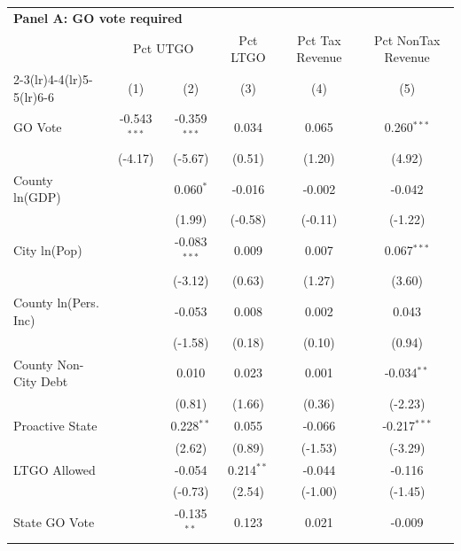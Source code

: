 \begingroup
\centering
\begin{tabular*}{\textwidth}{@{\extracolsep{\fill}}lccccc}
\multicolumn{5}{l}{\textbf{Panel A: GO vote required}}\\

\addlinespace
   \toprule
    & \multicolumn{2}{c}{Pct UTGO} & Pct LTGO & Pct Tax Revenue & Pct NonTax Revenue\\
   \cmidrule(lr){2-3}\cmidrule(lr){4-4}\cmidrule(lr){5-5}\cmidrule(lr){6-6}
                        & (1)            & (2)            & (3)          & (4)      & (5)\\  
   \midrule 
   GO Vote              & -0.543$^{***}$ & -0.359$^{***}$ & 0.034        & 0.065    & 0.260$^{***}$\\   
                        & (-4.17)       & (-5.67)       & (0.51)      & (1.20)  & (4.92)\\   
   County ln(GDP)       &                & 0.060$^{*}$    & -0.016       & -0.002   & -0.042\\   
                        &                & (1.99)        & (-0.58)     & (-0.11) & (-1.22)\\   
   City ln(Pop)         &                & -0.083$^{***}$ & 0.009        & 0.007    & 0.067$^{***}$\\   
                        &                & (-3.12)       & (0.63)      & (1.27)  & (3.60)\\   
   County ln(Pers. Inc) &                & -0.053         & 0.008        & 0.002    & 0.043\\   
                        &                & (-1.58)       & (0.18)      & (0.10)  & (0.94)\\   
   County Non-City Debt &                & 0.010          & 0.023        & 0.001    & -0.034$^{**}$\\   
                        &                & (0.81)        & (1.66)      & (0.36)  & (-2.23)\\   
   Proactive State      &                & 0.228$^{**}$   & 0.055        & -0.066   & -0.217$^{***}$\\   
                        &                & (2.62)        & (0.89)      & (-1.53) & (-3.29)\\   
   LTGO Allowed         &                & -0.054         & 0.214$^{**}$ & -0.044   & -0.116\\   
                        &                & (-0.73)       & (2.54)      & (-1.00) & (-1.45)\\   
   State GO Vote        &                & -0.135$^{**}$  & 0.123        & 0.021    & -0.009\\   

\end{tabular*}
